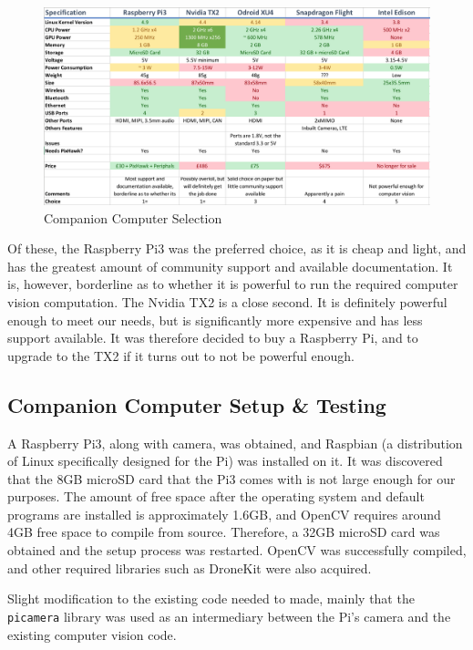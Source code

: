 \documentclass[11pt]{article}
\begin{document}
\begin{figure}[h]
    \includegraphics[width=\linewidth]{companion_computer_comparison}
    \caption{Companion Computer Selection} \label{fig:cc_selection}
\end{figure}

Of these, the Raspberry Pi3 was the preferred choice, as it is cheap and light, and has the greatest amount of community support and available documentation. It is, however, borderline as to whether it is powerful to run the required computer vision computation\cite{companion_computer_power}. The Nvidia TX2 is a close second. It is definitely powerful enough to meet our needs, but is significantly more expensive and has less support available. It was therefore decided to buy a Raspberry Pi, and to upgrade to the TX2 if it turns out to not be powerful enough.


\subsection{Companion Computer Setup \& Testing}
A Raspberry Pi3, along with camera, was obtained, and Raspbian (a distribution of Linux specifically designed for the Pi) was installed on it. It was discovered that the 8GB microSD card that the Pi3 comes with is not large enough for our purposes. The amount of free space after the operating system and default programs are installed is approximately 1.6GB, and OpenCV requires around 4GB free space to compile from source. Therefore, a 32GB microSD card was obtained and the setup process was restarted. OpenCV was successfully compiled, and other required libraries such as DroneKit were also acquired.

Slight modification to the existing code needed to made, mainly that the \lstinline|picamera| library was used as an intermediary between the Pi's camera and the existing computer vision code.
\end{document}
